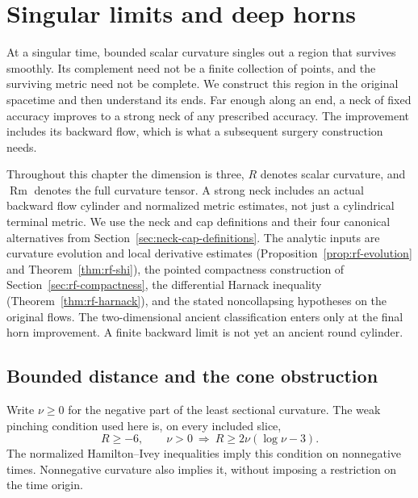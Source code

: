 \chapter{Singular limits and deep horns}
\label{ch:singular-limits-v4}

At a singular time, bounded scalar curvature singles out a region that
survives smoothly. Its complement need not be a finite collection of points,
and the surviving metric need not be complete. We construct this region in
the original spacetime and then understand its ends. Far enough along an end,
a neck of fixed accuracy improves to a strong neck of any prescribed
accuracy. The improvement includes its backward flow, which is what a
subsequent surgery construction needs.

Throughout this chapter the dimension is three, $R$ denotes scalar curvature,
and $\operatorname{Rm}$ denotes the full curvature tensor. A strong neck
includes an actual backward flow cylinder and normalized metric estimates,
not just a cylindrical terminal metric. We use the neck and cap definitions
and their four canonical alternatives from
Section~\ref{sec:neck-cap-definitions}.
The analytic inputs are curvature evolution and local derivative estimates
(Proposition~\ref{prop:rf-evolution} and Theorem~\ref{thm:rf-shi}),
the pointed compactness construction of Section~\ref{sec:rf-compactness},
the differential Harnack inequality (Theorem~\ref{thm:rf-harnack}), and
the stated noncollapsing hypotheses on the original flows.
The two-dimensional ancient classification enters only at the final horn
improvement. A finite backward limit is not yet an ancient round cylinder.

\section{Bounded distance and the cone obstruction}
\label{sec:singular-bounded-distance}

Write $\nu\geq0$ for the negative part of the least sectional curvature.
The weak pinching condition used here is, on every included slice,
\begin{equation}
 R\geq-6,\qquad
 \nu>0\ \Longrightarrow\ R\geq2\nu(\log\nu-3).
 \label{eq:singular-weak-pinching}
\end{equation}
The normalized Hamilton--Ivey inequalities imply this condition on
nonnegative times. Nonnegative curvature also implies it, without imposing
a restriction on the time origin.

